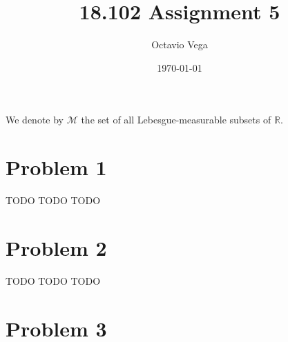 \documentclass{article}
\title{18.102 Assignment 5}
\author{Octavio Vega}
\date\today
\newcommand{\R}{\mathbb{R}} %
\newcommand{\M}{\mathcal{M}} %
\begin{document}
\maketitle

We denote by $\M$ the set of all Lebesgue-measurable subsets of $\R$.

\section*{Problem 1}
TODO TODO TODO
\section*{Problem 2}
TODO TODO TODO 
\section*{Problem 3}
\end{document}
